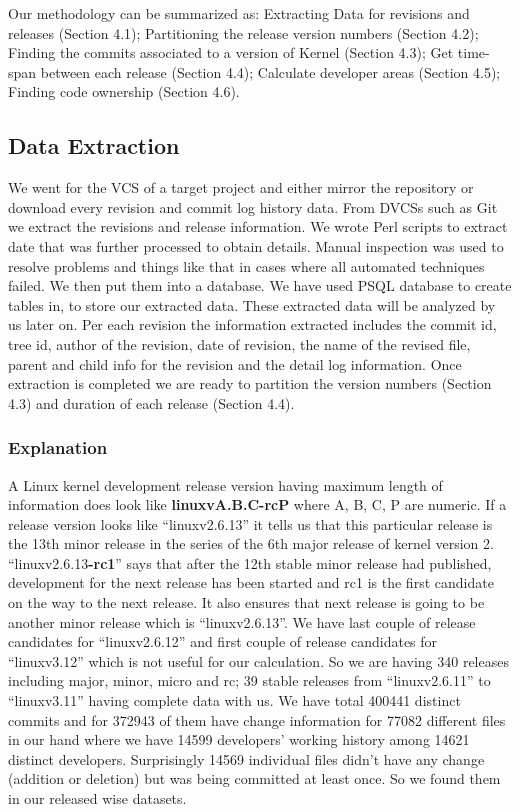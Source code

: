 \documentclass{acm_proc_article-sp}
\begin{document}
Our methodology can be summarized as: Extracting Data for revisions and releases (Section 4.1); Partitioning the release version numbers (Section 4.2); Finding the commits associated to a version of Kernel (Section 4.3); Get time-span between each release (Section 4.4); Calculate developer areas (Section 4.5); Finding code ownership (Section 4.6).

\subsection{Data Extraction}
We went for the VCS of a target project and either mirror the repository or download every revision and commit log history data. From DVCSs such as Git we extract the revisions and release information. We wrote Perl scripts to extract date that was further processed to obtain details. Manual inspection was used to resolve problems and things like that in cases where all automated techniques failed.
We then put them into a database. We have used PSQL database to create tables in, to store our extracted data. These extracted data will be analyzed by us later on. Per each revision the information extracted includes the commit id, tree id, author of the revision, date of revision, the name of the revised file, parent and child info for the revision and the detail log information. Once extraction is completed we are ready to partition the version numbers (Section 4.3) and duration  of each release (Section 4.4).

\subsubsection{Explanation}
A Linux kernel development release version having maximum length of information does look like \textbf{linuxvA.B.C-rcP} where A, B, C, P are numeric. If a release version looks like ``linuxv2.6.13'' it tells us that this particular release is the 13th minor release in the series of the 6th major release of kernel version 2. ``linuxv2.6.13\textbf{-rc1}'' says that after the 12th stable minor release had published, development for the next release has been started and rc1 is the first candidate on the way to the next release. It also ensures that next release is going to be another minor release which is ``linuxv2.6.13''. We have last couple of release candidates for ``linuxv2.6.12'' and first couple of release candidates for ``linuxv3.12'' which is not useful for our calculation. So we are having 340 releases including major, minor, micro and rc; 39 stable releases from ``linuxv2.6.11'' to ``linuxv3.11'' having complete data with us. We have total 400441 distinct commits and for 372943 of them have change information for 77082 different files in our hand where we have 14599 developers' working history among 14621 distinct developers. Surprisingly 14569 individual files didn't have any change (addition or deletion) but was being committed at least once. So we found them in our released wise datasets.
\end{document}
